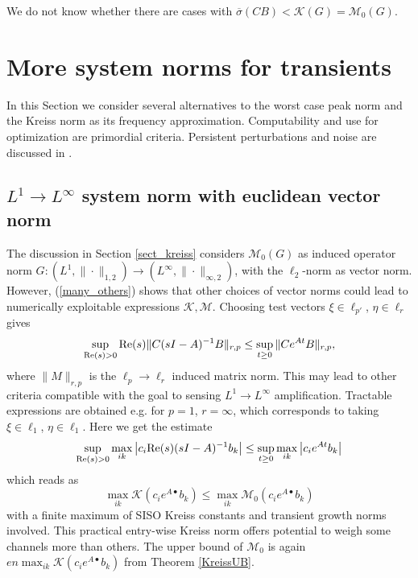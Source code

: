 \documentclass[12pt, a4paper,reqno]{amsart}
\theoremstyle{definition}
\begin{document}
We do not know whether there are cases with
$\overline{\sigma}(CB) < \mathcal K(G) = \mathcal M_0(G)$.



\section{More system norms for transients}
\label{sect_norms2}
In this Section we consider several alternatives to the worst case peak norm and the Kreiss
norm as its frequency approximation. Computability and use for optimization are
primordial criteria. Persistent perturbations and noise are discussed in .

\subsection{$L^1 \to L^\infty$ system norm with euclidean vector norm}
\label{sect_more}
The discussion in Section \ref{sect_kreiss} considers $\mathcal M_0(G)$ as induced operator norm $G:(L^1,\|\cdot\|_{1,2}) \to (L^\infty,\|\cdot\|_{\infty,2})$, 
with the $\ell_2$-norm
as vector norm. However, (\ref{many_others}) shows that other choices of vector norms could lead to numerically exploitable
expressions $\mathcal K, \mathcal M$. Choosing test vectors $\xi\in \ell_{p'}$, $\eta\in \ell_r$ gives
$$
\sup_{{\rm Re}(s) > 0}{\rm Re}(s) \| C(sI-A)^{-1}B\|_{r,p} \leq \sup_{t\geq 0} \| Ce^{At} B\|_{r,p},
$$
where $\|M\|_{r,p}$ is the $\ell_p \to \ell_r$ induced matrix norm. This may lead to other criteria compatible
with the goal to sensing $L^1 \to L^\infty$ amplification. 
Tractable expressions are obtained e.g. for $p=1$, $r=\infty$, which corresponds to taking
$\xi\in \ell_1$, $\eta\in \ell_1$. Here we get the estimate
$$
\sup_{{\rm Re}(s) > 0} \max_{ik} \left| c_i {\rm Re}(s) (sI-A)^{-1} b_k\right| \leq \sup_{t\geq 0} \max_{ik}  \left| c_i e^{At}b_k\right|
$$
which reads as
$$
\max_{ik} \mathcal K(c_i e^{A\bullet}b_k) \leq \max_{ik} \mathcal M_0(c_i e^{A\bullet} b_k)
$$
with a finite maximum of SISO Kreiss constants and transient growth norms involved. This practical entry-wise Kreiss norm offers potential to weigh some channels more than others. The upper bound of $\mathcal M_0$ is again  $e n \max_{ik} \mathcal K(c_i e^{A\bullet}b_k)$ from Theorem \ref{KreissUB}.
\end{document}
